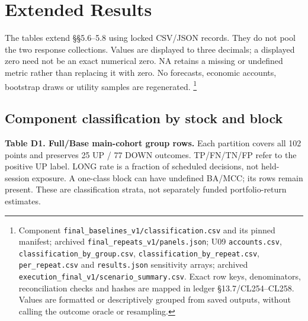 \chapter{Extended Results}\label{s:7072b9ca73206095}

The tables extend §§5.6--5.8 using locked CSV/JSON records. They do not
pool the two response collections. Values are displayed to three decimals;
a displayed zero need not be an exact numerical zero. NA retains a missing
or undefined metric rather than replacing it with zero. No forecasts,
economic accounts, bootstrap draws or utility samples are regenerated.
\footnote{Component \texttt{final\_\allowbreak{}baselines\_\allowbreak{}v1/\allowbreak{}classification.\allowbreak{}csv} and its pinned manifest; archived \texttt{final\_\allowbreak{}repeats\_\allowbreak{}v1/\allowbreak{}panels.\allowbreak{}json}; U09 \texttt{accounts.\allowbreak{}csv}, \texttt{classification\_\allowbreak{}by\_\allowbreak{}group.\allowbreak{}csv}, \texttt{classification\_\allowbreak{}by\_\allowbreak{}repeat.\allowbreak{}csv}, \texttt{per\_\allowbreak{}repeat.\allowbreak{}csv} and \texttt{results.\allowbreak{}json} sensitivity arrays; archived \texttt{execution\_\allowbreak{}final\_\allowbreak{}v1/\allowbreak{}scenario\_\allowbreak{}summary.\allowbreak{}csv}. Exact row keys, denominators, reconciliation checks and hashes are mapped in ledger §13.7/CL254--CL258. Values are formatted or descriptively grouped from saved outputs, without calling the outcome oracle or resampling.}

\section{Component classification by stock and block}\label{s:76f293631b51a105}

\textbf{Table D1. Full/Base main-cohort group rows.} Each partition covers all
102 points and preserves 25 UP / 77 DOWN outcomes. TP/\allowbreak{}FN/\allowbreak{}TN/\allowbreak{}FP refer to
the positive UP label. LONG rate is a fraction of scheduled decisions,
not held-session exposure. A one-class block can have undefined BA/MCC;
its rows remain present. These are classification strata, not separately
funded portfolio-return estimates.

